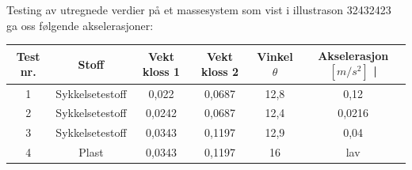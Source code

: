 \documentclass[10pt,a4paper]{report}
\begin{document}
Testing av utregnede verdier på et massesystem som vist i illustrason 32432423 ga oss følgende akselerasjoner:

\begin{center}
  \begin{tabular}{| c | c | c | c | c  | c |}
    \hline
    Test nr. & Stoff & Vekt kloss 1 & Vekt kloss 2 & Vinkel $\theta$ & Akselerasjon $[m/s^2]$ | \\ \hline
    1 & Sykkelsetestoff & 0,022 & 0,0687 & 12,8 & 0,12 \\ \hline
    2 & Sykkelsetestoff & 0,0242  & 0,0687 & 12,4 & 0,0216 \\ \hline
    3 & Sykkelsetestoff & 0,0343 & 0,1197 & 12,9 & 0,04 \\ \hline
    4 & Plast & 0,0343 & 0,1197 & 16 & lav  \\ \hline
  \end{tabular}
\end{center}
\end{document}
